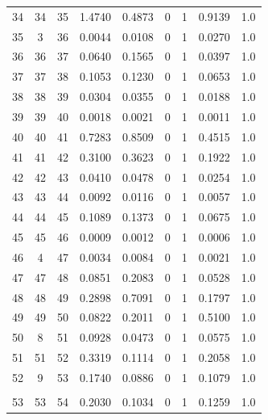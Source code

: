 \begin{longtable}{ccccccccc}
	34 & 34 & 35 & 1.4740 & 0.4873 & 0 & 1 & 0.9139 & 1.0 \\
	35 & 3 & 36 & 0.0044 & 0.0108 & 0 & 1 & 0.0270 & 1.0 \\
	36 & 36 & 37 & 0.0640 & 0.1565 & 0 & 1 & 0.0397 & 1.0 \\
	37 & 37 & 38 & 0.1053 & 0.1230 & 0 & 1 & 0.0653 & 1.0 \\
	38 & 38 & 39 & 0.0304 & 0.0355 & 0 & 1 & 0.0188 & 1.0\\
	39 & 39 & 40 & 0.0018 & 0.0021 & 0 & 1 & 0.0011 & 1.0 \\
	40 & 40 & 41 & 0.7283 & 0.8509 & 0 & 1 & 0.4515 & 1.0 \\
	41 & 41 & 42 & 0.3100 & 0.3623 & 0 & 1 & 0.1922 & 1.0 \\
	42 & 42 & 43 & 0.0410 & 0.0478 & 0 & 1 & 0.0254 & 1.0 \\ 
	43 & 43 & 44 & 0.0092 & 0.0116 & 0 & 1 & 0.0057 & 1.0 \\
	44 & 44 & 45 & 0.1089 & 0.1373 & 0 & 1 & 0.0675 & 1.0 \\
	45 & 45 & 46 & 0.0009 & 0.0012 & 0 & 1 & 0.0006 & 1.0 \\
	46 & 4 & 47 & 0.0034 & 0.0084 & 0 & 1 & 0.0021 & 1.0 \\
	47 & 47 & 48 & 0.0851 & 0.2083 & 0 & 1 & 0.0528 & 1.0 \\
	48 & 48 & 49 & 0.2898 & 0.7091 & 0 & 1 & 0.1797 & 1.0 \\
	49 & 49 & 50 & 0.0822 & 0.2011 & 0 & 1 & 0.5100 & 1.0 \\
	50 & 8 & 51 & 0.0928 & 0.0473 & 0 & 1 & 0.0575 & 1.0 \\
	51 & 51 & 52 & 0.3319 & 0.1114 & 0 & 1 & 0.2058 & 1.0 \\
	52 & 9 & 53 & 0.1740 & 0.0886 & 0 & 1 & 0.1079 & 1.0 \\
			\toprule\\
	\hline
	53 & 53 & 54 & 0.2030 & 0.1034 & 0 & 1 & 0.1259 & 1.0 \\


\end{longtable}
